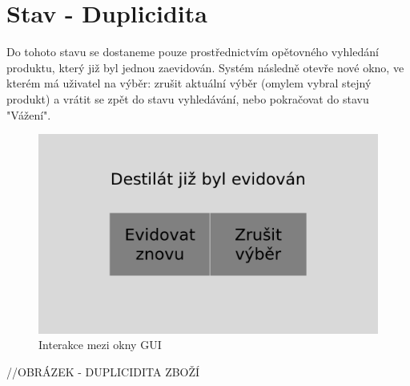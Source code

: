
\section{Stav - Duplicidita}


Do tohoto stavu se dostaneme pouze prostřednictvím opětovného vyhledání produktu, který již byl jednou zaevidován. Systém následně otevře nové okno, ve kterém má uživatel na výběr: zrušit aktuální výběr (omylem vybral stejný produkt) a vrátit se zpět do stavu vyhledávání, nebo pokračovat do stavu "Vážení".

\begin{figure}[H]
    \begin{center}
        \includegraphics[scale=0.4]{obrazky/GUI Duplicidita.png}
    \end{center}
    \caption{Interakce mezi okny GUI}
    \label{Interakce mezi okny GUI}
\end{figure}
//OBRÁZEK - DUPLICIDITA ZBOŽÍ

